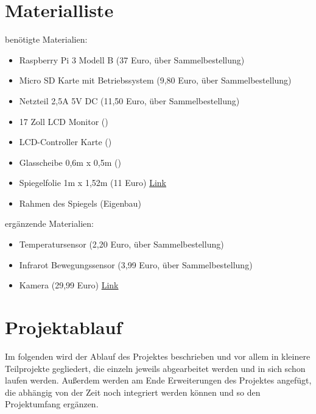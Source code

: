 \documentclass[11pt,a4paper]{article}
\begin{document}
\section{Materialliste}
benötigte Materialien:
\begin{itemize}
	\item Raspberry Pi 3 Modell B (37 Euro, über Sammelbestellung)
	\item Micro SD Karte mit Betriebssystem (9,80 Euro, über Sammelbestellung)
	\item Netzteil 2,5A 5V DC (11,50 Euro, über Sammelbestellung)
	\item 17 Zoll LCD Monitor ()
	\item LCD-Controller Karte ()
	\item Glasscheibe 0,6m x 0,5m ()
	\item Spiegelfolie 1m x 1,52m (11 Euro) \href{https://www.amazon.de/Spiegel-Fenster-Silber7-Selbstklebend-1mx152cm/dp/B01A3HXF38/ref=sr_1_4?ie=UTF8\& qid=1494346770\& sr=8-4\& keywords=spionfolie}{Link}
	\item Rahmen des Spiegels (Eigenbau)
\end{itemize}

ergänzende Materialien:
\begin{itemize}
	\item Temperatursensor (2,20 Euro, über Sammelbestellung)
	\item Infrarot Bewegungssensor (3,99 Euro, über Sammelbestellung)
	\item Kamera (29,99 Euro) \href{https://www.rasppishop.de/NoIR-Kameramodul-Raspberry-Pi-Kamera-V2}{Link}
\end{itemize}

\section{Projektablauf}
Im folgenden wird der Ablauf des Projektes beschrieben und vor allem in kleinere Teilprojekte gegliedert, die einzeln jeweils abgearbeitet werden und in sich schon laufen werden. Außerdem werden am Ende Erweiterungen des Projektes angefügt, die abhängig von der Zeit noch integriert werden können und so den Projektumfang ergänzen.
\end{document}
